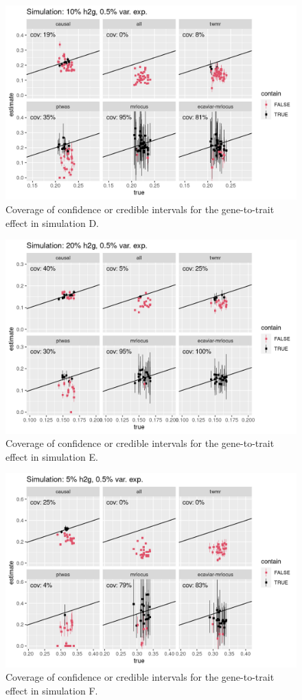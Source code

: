 \documentclass[11pt]{article}
\begin{document}
\begin{figure}[!ht]
  \centering
  \includegraphics[width=.8\textwidth]{figs/cover4.png}
  \caption{Coverage of confidence or credible intervals for the
    gene-to-trait effect in simulation D.}
\end{figure}

\begin{figure}[!ht]
  \centering
  \includegraphics[width=.8\textwidth]{figs/cover6.png}
  \caption{Coverage of confidence or credible intervals for the
    gene-to-trait effect in simulation E.}
\end{figure}

\begin{figure}[!ht]
  \centering
  \includegraphics[width=.8\textwidth]{figs/cover8.png}
  \caption{Coverage of confidence or credible intervals for the
    gene-to-trait effect in simulation F.}
\end{figure}
\end{document}
